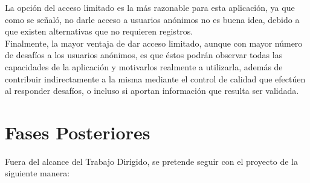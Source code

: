 \documentclass[10pt,letterpaper]{article}
\begin{document}
\begin{enumerate}
La opción del acceso limitado es la más razonable para esta aplicación, ya que como se señaló, no darle acceso a usuarios anónimos no es buena idea, debido a que existen alternativas que no requieren registros.\\

Finalmente, la mayor ventaja de dar acceso limitado, aunque con mayor número de desafíos a los usuarios anónimos, es que éstos podrán observar todas las capacidades de la aplicación y motivarlos realmente a utilizarla, además de contribuir indirectamente a la misma mediante el control de calidad que efectúen al responder desafíos, o incluso si aportan información que resulta ser validada.\\

\end{enumerate}


\newpage
\section{Fases Posteriores}

Fuera del alcance del Trabajo Dirigido, se pretende seguir con el proyecto de la siguiente manera:\\
\end{document}
